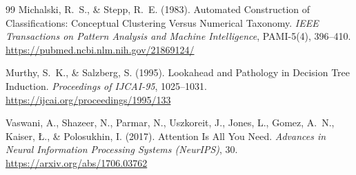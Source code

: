 \documentclass[10pt,a4paper]{article}
\begin{document}
\begin{thebibliography}{99}
Michalski, R.~S., \& Stepp, R.~E. (1983). Automated Construction of Classifications: Conceptual Clustering Versus Numerical Taxonomy. \textit{IEEE Transactions on Pattern Analysis and Machine Intelligence}, PAMI-5(4), 396--410. \url{https://pubmed.ncbi.nlm.nih.gov/21869124/}

Murthy, S.~K., \& Salzberg, S. (1995). Lookahead and Pathology in Decision Tree Induction. \textit{Proceedings of IJCAI-95}, 1025--1031. \url{https://ijcai.org/proceedings/1995/133}

Vaswani, A., Shazeer, N., Parmar, N., Uszkoreit, J., Jones, L., Gomez, A.~N., Kaiser, \L., \& Polosukhin, I. (2017). Attention Is All You Need. \textit{Advances in Neural Information Processing Systems (NeurIPS)}, 30. \url{https://arxiv.org/abs/1706.03762}
\end{thebibliography}
\end{document}
